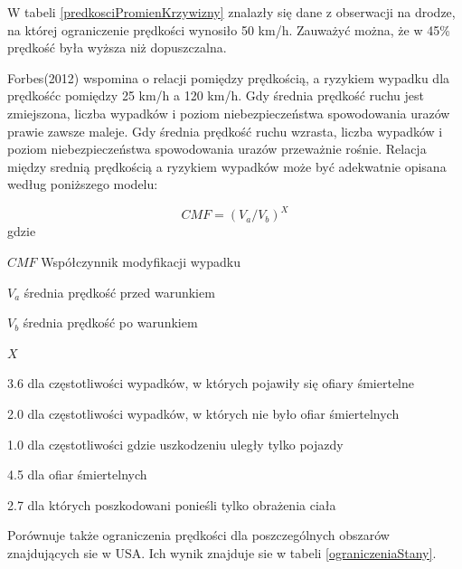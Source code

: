 W tabeli \ref{predkosciPromienKrzywizny} znalazły się dane z obserwacji na drodze, na której ograniczenie prędkości wynosiło 50 km/h. Zauważyć można, że w 45\% prędkość była wyższa niż  dopuszczalna.

Forbes(2012) wspomina o relacji pomiędzy prędkością, a ryzykiem wypadku dla prędkośćc pomiędzy 25 km/h a 120 km/h. Gdy średnia prędkość ruchu jest zmiejszona, liczba wypadków i  poziom niebezpieczeństwa spowodowania urazów prawie zawsze maleje. Gdy średnia prędkość ruchu wzrasta, liczba wypadków i poziom niebezpieczeństwa spowodowania urazów przeważnie rośnie. Relacja między srednią prędkością a ryzykiem wypadków może być adekwatnie opisana według poniższego modelu:

\begin{equation}
CMF = (V_a / V_b)^X
\end{equation}
gdzie
\begin{eqwhere}[2cm]
	\item[$CMF$] Współczynnik modyfikacji wypadku
	\item[$V_a$] średnia prędkość przed warunkiem
	\item[$V_b$] średnia prędkość po warunkiem
	\item[$X$] \begin{itemize}
		3.6 dla częstotliwości wypadków, w których pojawiły się ofiary śmiertelne
		
		2.0 dla częstotliwości wypadków, w których nie było ofiar śmiertelnych
		
		1.0 dla częstotliwości gdzie uszkodzeniu uległy tylko pojazdy
		
		4.5 dla ofiar śmiertelnych
		
		2.7 dla których poszkodowani ponieśli tylko obrażenia ciała
	\end{itemize}

\end{eqwhere}
Porównuje także ograniczenia prędkości dla poszczególnych obszarów znajdujących sie w USA. Ich wynik znajduje sie w tabeli \ref{ograniczeniaStany}.

